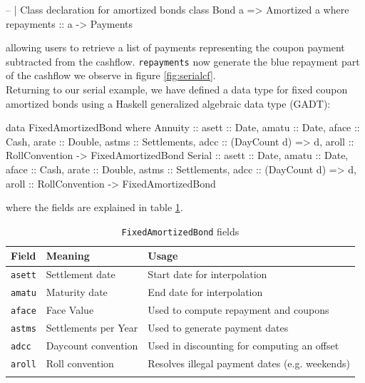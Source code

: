 \begin{hscode}
-- | Class declaration for amortized bonds
class Bond a => Amortized a where
  repayments :: a -> Payments
\end{hscode}

allowing users to retrieve a list of payments representing the coupon payment
subtracted from the cashflow. \texttt{repayments} now generate the blue repayment part of the cashflow
we observe in figure \ref{fig:serialcf}.\\

Returning to our serial example, we have defined a data type for fixed coupon
amortized bonds using a Haskell generalized algebraic data type (GADT):

\begin{hscode}
data FixedAmortizedBond where 
  Annuity :: { asett :: Date,
               amatu :: Date,
               aface :: Cash,
               arate :: Double,
               astms :: Settlements,
               adcc  :: (DayCount d) => d,
               aroll :: RollConvention } -> FixedAmortizedBond
  Serial :: {  asett :: Date,
               amatu :: Date,
               aface :: Cash,
               arate :: Double,
               astms :: Settlements,
               adcc  :: (DayCount d) => d,
               aroll :: RollConvention } -> FixedAmortizedBond
\end{hscode}

where the fields are explained in table \ref{tab:fieldz}.\\

\begin{center}  
\begin{longtable}{l|l|l}
Field & Meaning & Usage\\\hline
\texttt{asett} & Settlement date & Start date for interpolation\\
\texttt{amatu} & Maturity date & End date for interpolation\\
\texttt{aface} & Face Value & Used to compute repayment and coupons\\
\texttt{astms} & Settlements per Year & Used to generate payment dates\\
\texttt{adcc} & Daycount convention & Used in discounting for computing an offset\\
\texttt{aroll} & Roll convention & Resolves illegal payment dates (e.g. weekends)\\
\caption{\texttt{FixedAmortizedBond} fields}
\label{tab:fieldz}
\end{longtable}
\end{center}

